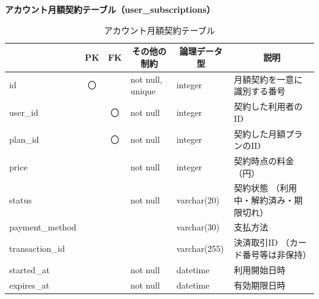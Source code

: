 \noindent\textbf{アカウント月額契約テーブル（user\_subscriptions）}
\begin{table}[H]
    \centering
    \caption{アカウント月額契約テーブル}
    \label{tab:user_subscriptions_table}
    \begin{tabularx}{\linewidth}{|l|c|c|l|l|X|}
        \hline
        \rowcolor{tableblue}
        \multicolumn{1}{|c|}{カラム名} & \multicolumn{1}{c|}{PK} & \multicolumn{1}{c|}{FK} & \multicolumn{1}{c|}{その他の制約} & \multicolumn{1}{c|}{論理データ型} & \multicolumn{1}{c|}{説明} \\ \hline
        id & 〇 & & not null, unique & integer & 月額契約を一意に識別する番号 \\ \hline
        user\_id & & 〇 & not null & integer & 契約した利用者のID \\ \hline
        plan\_id & & 〇 & not null & integer & 契約した月額プランのID \\ \hline
        price & & & not null & integer & 契約時点の料金（円） \\ \hline
        status & & & not null & varchar(20) & 契約状態 \newline（利用中・解約済み・期限切れ） \\ \hline
        payment\_method & & & & varchar(30) & 支払方法 \\ \hline
        transaction\_id & & & & varchar(255) & 決済取引ID \newline（カード番号等は非保持） \\ \hline
        started\_at & & & not null & datetime & 利用開始日時 \\ \hline
        expires\_at & & & not null & datetime & 有効期限日時 \\ \hline
    \end{tabularx}
\end{table}